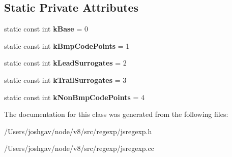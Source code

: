 \subsection*{Static Private Attributes}
\begin{DoxyCompactItemize}
\item 
static const int {\bfseries k\+Base} = 0\hypertarget{classv8_1_1internal_1_1_unicode_range_splitter_a7c9b45406acb3d626311803829db7d58}{}\label{classv8_1_1internal_1_1_unicode_range_splitter_a7c9b45406acb3d626311803829db7d58}

\item 
static const int {\bfseries k\+Bmp\+Code\+Points} = 1\hypertarget{classv8_1_1internal_1_1_unicode_range_splitter_a539fcbb5698647e54ee189b2dc99cb36}{}\label{classv8_1_1internal_1_1_unicode_range_splitter_a539fcbb5698647e54ee189b2dc99cb36}

\item 
static const int {\bfseries k\+Lead\+Surrogates} = 2\hypertarget{classv8_1_1internal_1_1_unicode_range_splitter_a2592a0bef7b63c65b2477efcb08ffae7}{}\label{classv8_1_1internal_1_1_unicode_range_splitter_a2592a0bef7b63c65b2477efcb08ffae7}

\item 
static const int {\bfseries k\+Trail\+Surrogates} = 3\hypertarget{classv8_1_1internal_1_1_unicode_range_splitter_aefd383ccd2f618090c32e92f26ddc81e}{}\label{classv8_1_1internal_1_1_unicode_range_splitter_aefd383ccd2f618090c32e92f26ddc81e}

\item 
static const int {\bfseries k\+Non\+Bmp\+Code\+Points} = 4\hypertarget{classv8_1_1internal_1_1_unicode_range_splitter_a743f76b449565ece35fb9a18537e3a90}{}\label{classv8_1_1internal_1_1_unicode_range_splitter_a743f76b449565ece35fb9a18537e3a90}

\end{DoxyCompactItemize}


The documentation for this class was generated from the following files\+:\begin{DoxyCompactItemize}
\item 
/\+Users/joshgav/node/v8/src/regexp/jsregexp.\+h\item 
/\+Users/joshgav/node/v8/src/regexp/jsregexp.\+cc\end{DoxyCompactItemize}
